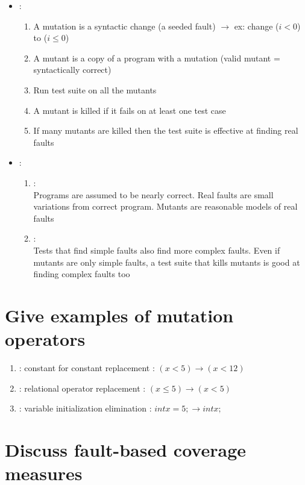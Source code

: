 \begin{itemize}
    \item {} :
    \begin{enumerate}
        \item A mutation is a syntactic change (a seeded fault) $\rightarrow$ ex: change ($i<0$) to ($i\leq0$)
        \item A mutant is a copy of a program with a mutation (valid mutant = syntactically correct)
        \item Run test suite on all the mutants
        \item A mutant is killed if it fails on at least one test case
        \item If many mutants are killed then the test suite is effective at finding real faults
    \end{enumerate}
    \item {} :
    \begin{enumerate}
        \item {} :\\
        Programs are assumed to be nearly correct. Real faults are small variations from correct program. Mutants are reasonable models of real faults
        \item {} : \\
        Tests that find simple faults also find more complex faults. Even if mutants are only simple faults, a test suite that kills mutants is good at finding complex faults too
    \end{enumerate}
\end{itemize}

\section{Give examples of mutation operators}

\begin{enumerate}
    \item {}: constant for constant replacement : $(x < 5) \rightarrow (x < 12)$
    \item {}: relational operator replacement : $(x \leq 5) \rightarrow (x < 5)$
    \item {}: variable initialization elimination : $int x = 5; \rightarrow int x;$
\end{enumerate}

\section{Discuss fault-based coverage measures}


